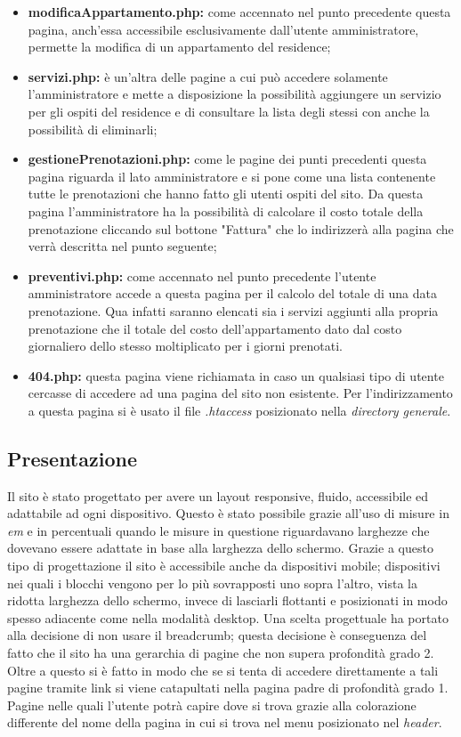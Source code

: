 \documentclass[12pt]{article}
\begin{document}
\begin{itemize}
\item \textbf{modificaAppartamento.php:} come accennato nel punto precedente questa pagina, anch'essa accessibile esclusivamente dall'utente amministratore, permette la modifica di un appartamento del residence;
\item \textbf{servizi.php:} è un'altra delle pagine a cui può accedere solamente l'amministratore e mette a disposizione la possibilità aggiungere un servizio per gli ospiti del residence e di consultare la lista degli stessi con anche la possibilità di eliminarli;
\item \textbf{gestionePrenotazioni.php:} come le pagine dei punti precedenti questa pagina riguarda il lato amministratore e si pone come una lista contenente tutte le prenotazioni che hanno fatto gli utenti ospiti del sito. Da questa pagina l'amministratore ha la possibilità di calcolare il costo totale della prenotazione cliccando sul bottone "Fattura" che lo indirizzerà alla pagina che verrà descritta nel punto seguente; 
\item \textbf{preventivi.php:} come accennato nel punto precedente l'utente amministratore accede a questa pagina per il calcolo del totale di una data prenotazione. Qua infatti saranno elencati sia i servizi aggiunti alla propria prenotazione che il totale del costo dell'appartamento dato dal costo giornaliero dello stesso moltiplicato per i giorni prenotati. 
\item \textbf{404.php:} questa pagina viene richiamata in caso un qualsiasi tipo di utente cercasse di accedere ad una pagina del sito non esistente. Per l'indirizzamento a questa pagina si è usato il file \textit{.htaccess} posizionato nella \textit{directory generale}.
\end{itemize}

\newpage
\subsection{Presentazione}
Il sito è stato progettato per avere un layout responsive, fluido, accessibile ed adattabile ad ogni dispositivo. Questo è stato possibile grazie all'uso di misure in \textit{em} e in percentuali quando le misure in questione riguardavano larghezze che dovevano essere adattate in base alla larghezza dello schermo. Grazie a questo tipo di progettazione il sito è accessibile anche da dispositivi mobile; dispositivi nei quali i blocchi vengono per lo più sovrapposti uno sopra l'altro, vista la ridotta larghezza dello schermo, invece di lasciarli flottanti e posizionati in modo spesso adiacente come nella modalità desktop. Una scelta progettuale ha portato alla decisione di non usare il breadcrumb; questa decisione è conseguenza del fatto che il sito ha una gerarchia di pagine che non supera profondità grado 2. Oltre a questo si è fatto in modo che se si tenta di accedere direttamente a tali pagine tramite link si viene catapultati nella pagina padre di profondità grado 1. Pagine nelle quali l'utente potrà capire dove si trova grazie alla colorazione differente del nome della pagina in cui si trova nel menu posizionato nel \textit{header}.
\end{document}
